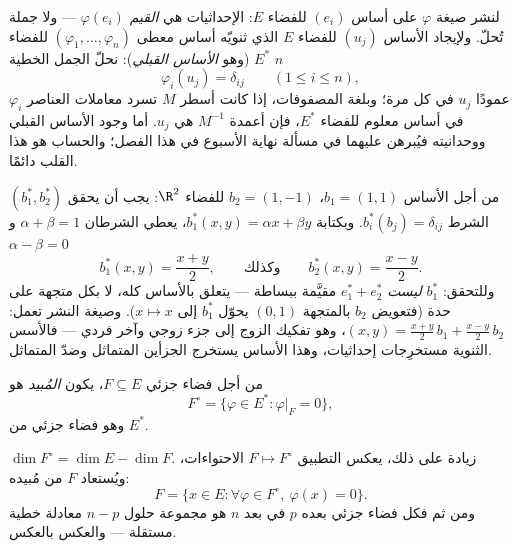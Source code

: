 \begin{method}\label{met:b2:linalg:dualbasis}
لنشر صيغة $\varphi$ على أساس $(e_i)$ للفضاء $E$:
الإحداثيات هي \emph{القيم} $\varphi(e_i)$ --- ولا جملة تُحلّ.
ولإيجاد الأساس $(u_j)$ للفضاء $E$ الذي ثنويّه أساس معطى
$(\varphi_1, \dots, \varphi_n)$ للفضاء $E^*$ (وهو
\emph{الأساس القبلي}): نحلّ الجمل الخطية $n$
\[
\varphi_i(u_j) = \delta_{ij} \qquad (1 \leq i \leq n),
\]
عمودًا $u_j$ في كل مرة؛ وبلغة المصفوفات، إذا كانت أسطر $M$
تسرد معاملات العناصر $\varphi_i$ في أساس معلوم للفضاء
$E^*$، فإن أعمدة $M^{-1}$ هي $u_j$. أما وجود الأساس القبلي
ووحدانيته فيُبرهن عليهما في مسألة نهاية الأسبوع في هذا الفصل؛
والحساب هو هذا القلب دائمًا.
\end{method}

\begin{example}\label{ex:b2:linalg:dualbasis2d}
من أجل الأساس $b_1 = (1, 1)$، $b_2 = (1, -1)$ للفضاء $\R^2$: يجب أن يحقق
 $(b_1^*, b_2^*)$ الشرط $b_i^*(b_j) =
\delta_{ij}$. وبكتابة $b_1^*(x, y) = \alpha x + \beta y$، يعطي
الشرطان $\alpha + \beta = 1$ و$\alpha - \beta = 0$
\[
b_1^*(x, y) = \frac{x + y}{2},
\qquad\text{وكذلك}\qquad
b_2^*(x, y) = \frac{x - y}{2} .
\]
وللتحقق: $b_1^*$ \emph{ليست} $e_1^* + e_2^*$ مقيَّمة
ببساطة ---  يتعلق بالأساس كله، لا بكل
متجهة على حدة (فتعويض $b_2$ بالمتجهة $(0, 1)$ يحوّل
$b_1^*$ إلى $x \mapsto x$). وصيغة النشر تعمل:
$(x, y) = \frac{x+y}2\,b_1 + \frac{x-y}2\,b_2$، وهو تفكيك
الزوج إلى جزء زوجي وآخر فردي --- فالأسس الثنوية مستخرِجات
إحداثيات، وهذا الأساس يستخرج الجزأين المتماثل وضدّ المتماثل.
\end{example}

\begin{definition}\label{def:b2:linalg:annihilator}
من أجل فضاء جزئي $F \subseteq E$، يكون
\emph{المُبيد} هو
\[
F^{\circ} = \{\varphi \in E^* : \varphi|_F = 0\},
\]
وهو فضاء جزئي من $E^*$.
\end{definition}

\begin{theorem}\label{thm:b2:linalg:annihilator}
$\dim F^{\circ} = \dim E - \dim F$. زيادة على ذلك، يعكس التطبيق $F \mapsto F^\circ$
الاحتواءات، ويُستعاد $F$ من مُبيده:
\[
F = \{x \in E : \forall\varphi \in F^\circ,\ \varphi(x) = 0\}.
\]
ومن ثم فكل فضاء جزئي بعده $p$ في بعد $n$ هو
مجموعة حلول $n - p$ معادلة خطية مستقلة --- والعكس بالعكس.
\end{theorem}

